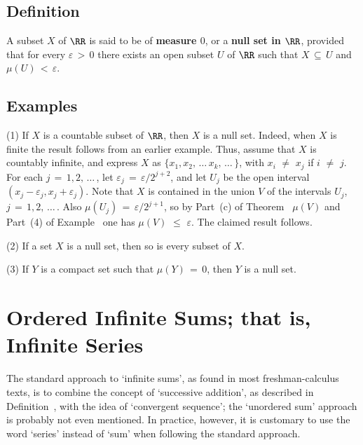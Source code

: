        \subsection{\small{{\bf Definition}}}
        \label{DefG25.40}

        A subset $X$ of ${\RR}$ is said to be of {\bf measure $0$}, or a {\bf null set in ${\RR}$},
    provided that for every ${\varepsilon}\,>\,0$ there exists an open subset $U$ of ${\RR}$ such that $X \,{\subseteq}\, U$ and ${\mu}(U)\,<\,{\varepsilon}$.

\V
\V

        \subsection{\small{{\bf Examples}}}
        \label{ExampG25.50}

\V

        (1) If $X$ is a countable subset of ${\RR}$, then $X$ is a null set. Indeed, when $X$ is finite the result follows from an earlier example.
    Thus, assume that $X$ is countably infinite, and express $X$ as $\{x_{1}, x_{2},\,{\ldots}\,x_{k}, \,{\ldots}\,\}$,
    with $x_{i} \,\,{\neq}\,\, x_{j}$ if $i \,\,{\neq}\,\, j$.
    For each $j \,=\, 1,2,\,{\ldots}\,$, let ${\varepsilon}_{j} \,=\, {\varepsilon}/2^{j+2}$,
    and let $U_{j}$ be the open interval $(x_{j} - {\varepsilon}_{j}, x_{j} + {\varepsilon}_{j})$.
    Note that $X$ is contained in the union $V$ of the intervals $U_{j}$, $j \,=\, 1,2,\,{\ldots}\,$.
    Also ${\mu}(U_{j}) \,=\, {\varepsilon}/2^{j+1}$, so by Part~(c) of Theorem~ ${\mu}(V)$ and Part~(4) of Example~
    one has ${\mu}(V)\,\,{\leq}\,\,{\varepsilon}$.
    The claimed result follows.

\V

        (2) If a set $X$ is a null set, then so is every subset of $X$.

\V

        (3) If $Y$ is a compact set such that ${\mu}(Y) \,=\, 0$, then $Y$ is a null set.

                \section{{\bf Ordered Infinite Sums; that is, Infinite Series}}
                \label{SectG30}

\V

        The standard approach to `infinite sums', as found in most freshman-calculus texts, is to combine the concept of `successive addition',
    as described in Definition~, with the idea of `convergent sequence';
    the `unordered sum' approach is probably not even mentioned.
    In practice, however, it is customary to use the word `series' instead of `sum' when following the standard approach.

